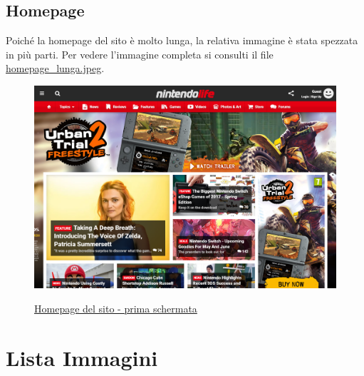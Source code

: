 \documentclass[12pt, a4paper,titlepage]{article}
\begin{document}
\subsection{Homepage}
\label{sub:homepage}
Poiché la homepage del sito è molto lunga, la relativa immagine è stata spezzata in più parti. Per vedere l'immagine completa si consulti il file \href{pic/homepage_lunga.jpeg}{\underline{homepage\_lunga.jpeg}}.
\begin{figure}[h]
\centering
\href{pic/homepage1.png}{\includegraphics[width=.8\textwidth]{homepage1}}
\caption{\href{pic/homepage1.png}{Homepage del sito - prima schermata}}
\end{figure}

\section{Lista Immagini}
\label{sec:immagini}
\end{document}
